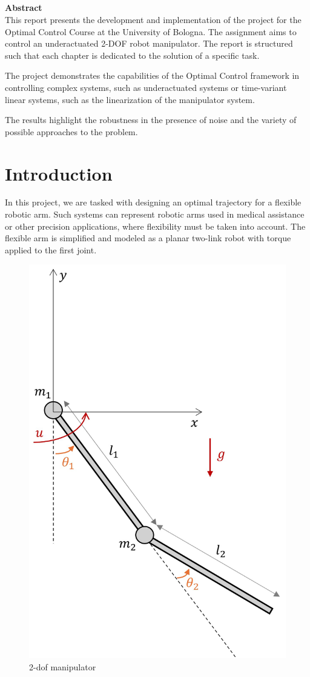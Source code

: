 \documentclass[a4paper,11pt,oneside]{book}
\begin{document}
\newpage
\thispagestyle{empty}

\begin{center}
\chapter*{}
\thispagestyle{empty}
{\Huge \textbf{Abstract}}\\
\vspace{15mm}
This report presents the development and implementation of the project for the Optimal Control Course at the University of Bologna. The assignment aims to control an underactuated 2-DOF robot manipulator. The report is structured such that each chapter is dedicated to the solution of a specific task.

The project demonstrates the capabilities of the Optimal Control framework in controlling complex systems, such as underactuated systems or time-variant linear systems, such as the linearization of the manipulator system.

The results highlight the robustness in the presence of noise and the variety of possible approaches to the problem.

\end{center}


\tableofcontents \thispagestyle{empty}

\chapter*{Introduction}

In this project, we are tasked with designing an optimal trajectory for a flexible robotic arm. Such systems can represent robotic arms used in medical assistance or other precision applications, where flexibility must be taken into account. The flexible arm is simplified and modeled as a planar two-link robot with torque applied to the first joint.

\begin{figure}[H]
    \centering
    \includegraphics[width=0.35\linewidth]{image.png}
    \caption{2-dof manipulator}
    \label{fig:-2-dof manipulator}
\end{figure}
\end{document}
